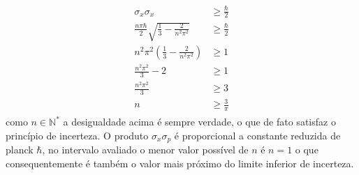 \begin{prob}
\begin{sol}
\begin{align}
			\begin{split}
				\sigma_{x} \sigma_{x} &\geq \frac{\hbar}{2}\\
				\frac{n \pi \hbar}{2}\sqrt{\frac{1}{3}-\frac{2}{n^{2} \pi^{2}}}&\geq \frac{\hbar}{2}\\
				n^{2} \pi^{2}\left(\frac{1}{3}-\frac{2}{n^{2} \pi^{2}}\right)&\geq 1\\
				\frac{n^{2} \pi^{2}}{3}-2&\geq 1\\
				\frac{n^{2} \pi^{2}}{3}&\geq 3\\
				n&\geq \frac{3}{\pi}
			\end{split}
		\end{align}
		como $n\in\mathbb{N^{*}}$ a desigualdade acima é sempre verdade, o que de fato satisfaz o princípio de incerteza. O produto $\sigma_{x} \sigma_{p}$ é proporcional a constante reduzida de planck $\hbar$, no intervalo avaliado o menor valor possível de $n$ é $n=1$ o que consequentemente é também o valor mais próximo do limite inferior de incerteza.


	\end{sol}
\end{prob}
